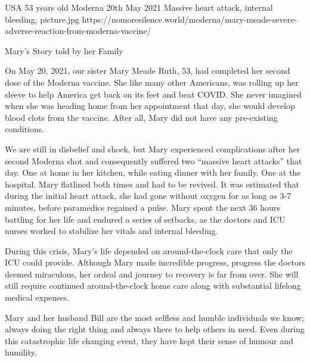 {USA}
{53 years old}
{Moderna}
{20th May 2021 }
{Massive heart attack, internal bleeding, }
{picture.jpg}
{https://nomoresilence.world/moderna/mary-meade-severe-adverse-reaction-from-moderna-vaccine/}
{

Mary’s Story told by her Family

On May 20, 2021, our sister Mary Meade Ruth, 53, had completed her second dose
of the Moderna vaccine. She like many other Americans, was rolling up her sleeve
to help America get back on its feet and beat COVID. She never imagined when she
was heading home from her appointment that day, she would develop blood clots
from the vaccine. After all, Mary did not have any pre-existing conditions.

We are still in disbelief and shock, but Mary experienced complications after
her second Moderna shot and consequently suffered two “massive heart attacks”
that day. One at home in her kitchen, while eating dinner with her family. One
at the hospital. Mary flatlined both times and had to be revived. It was
estimated that during the initial heart attack, she had gone without oxygen for
as long as 3-7 minutes, before paramedics regained a pulse. Mary spent the next
36 hours battling for her life and endured a series of setbacks, as the doctors
and ICU nurses worked to stabilize her vitals and internal bleeding.

During this crisis, Mary’s life depended on around-the-clock care that only the
ICU could provide. Although Mary made incredible progress, progress the doctors
deemed miraculous, her ordeal and journey to recovery is far from over. She will
still require continued around-the-clock home care along with substantial
lifelong medical expenses.

Mary and her husband Bill are the most selfless and humble individuals we know;
always doing the right thing and always there to help others in need. Even
during this catastrophic life changing event, they have kept their sense of
humour and humility.

}
